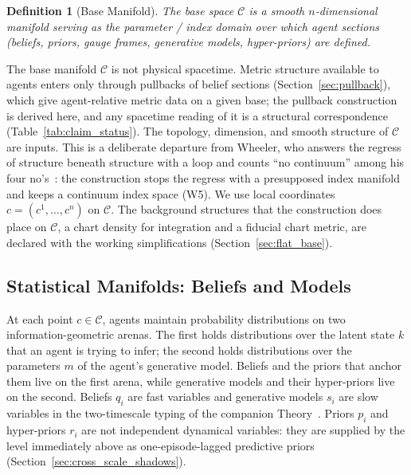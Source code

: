 \documentclass[11pt]{article}
\newtheorem{definition}{Definition}
\begin{document}
\begin{definition}[Base Manifold]
\label{def:base_manifold}
The base space $\mathcal{C}$ is a smooth $n$-dimensional manifold serving as the parameter / index domain over which agent sections (beliefs, priors, gauge frames, generative models, hyper-priors) are defined.
\end{definition}

The base manifold $\mathcal{C}$ is not physical spacetime. Metric structure available to agents enters only through pullbacks of belief sections (Section~\ref{sec:pullback}), which give agent-relative metric data on a given base; the pullback construction is derived here, and any spacetime reading of it is a structural correspondence (Table~\ref{tab:claim_status}). The topology, dimension, and smooth structure of $\mathcal{C}$ are inputs. This is a deliberate departure from Wheeler, who answers the regress of structure beneath structure with a loop and counts ``no continuum'' among his four no's~\cite{Wheeler1990}: the construction stops the regress with a presupposed index manifold and keeps a continuum index space (W5). We use local coordinates $c = (c^1, \ldots, c^n)$ on $\mathcal{C}$. The background structures that the construction does place on $\mathcal{C}$, a chart density for integration and a fiducial chart metric, are declared with the working simplifications (Section~\ref{sec:flat_base}).

\subsection{Statistical Manifolds: Beliefs and Models}
\label{sec:statistical_manifolds}

At each point $c \in \mathcal{C}$, agents maintain probability distributions on two information-geometric arenas. The first holds distributions over the latent state $k$ that an agent is trying to infer; the second holds distributions over the parameters $m$ of the agent's generative model. Beliefs and the priors that anchor them live on the first arena, while generative models and their hyper-priors live on the second. Beliefs $q_i$ are fast variables and generative models $s_i$ are slow variables in the two-timescale typing of the companion Theory~\cite[Ch.~8]{DennisGaugeVFE2026}. Priors $p_i$ and hyper-priors $r_i$ are not independent dynamical variables: they are supplied by the level immediately above as one-episode-lagged predictive priors (Section~\ref{sec:cross_scale_shadows}).
\end{document}
